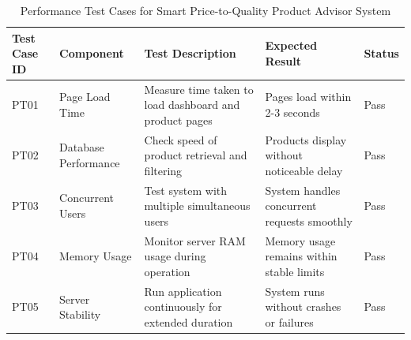 \begin{table}[H]
    \centering
    \renewcommand{\arraystretch}{1.3}
    \begin{tabular}{|p{1.5cm}|p{3cm}|p{3.4cm}|p{3cm}|p{1.2cm}|}
        \hline
        \textbf{Test Case ID} & \textbf{Component} & \textbf{Test Description} & \textbf{Expected Result} & \textbf{Status} \\
        \hline
        PT01 & Page Load Time & Measure time taken to load dashboard and product pages & Pages load within 2-3 seconds & Pass \\
        \hline
        PT02 & Database Performance & Check speed of product retrieval and filtering & Products display without noticeable delay & Pass \\
        \hline
        PT03 & Concurrent Users & Test system with multiple simultaneous users & System handles concurrent requests smoothly & Pass \\
        \hline
        PT04 & Memory Usage & Monitor server RAM usage during operation & Memory usage remains within stable limits & Pass \\
        \hline
        PT05 & Server Stability & Run application continuously for extended duration & System runs without crashes or failures & Pass \\
        \hline
    \end{tabular}
    \caption{Performance Test Cases for Smart Price-to-Quality Product Advisor System}
    \label{tab:performance_tests}
\end{table}